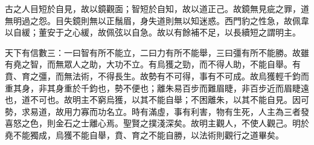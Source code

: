 
\begin{pinyinscope}
古之人目短於自見，故以鏡觀面；智短於自知，故以道正己。故鏡無見疵之罪，道無明過之怨。目失鏡則無以正鬚眉，身失道則無以知迷惑。西門豹之性急，故佩韋以自緩；董安于之心緩，故佩弦以自急。故以有餘補不足，以長續短之謂明主。

天下有信數三：一曰智有所不能立，二曰力有所不能舉，三曰彊有所不能勝。故雖有堯之智，而無眾人之助，大功不立。有烏獲之勁，而不得人助，不能自舉。有賁、育之彊，而無法術，不得長生。故勢有不可得，事有不可成。故烏獲輕千鈞而重其身，非其身重於千鈞也，勢不便也；離朱易百步而難眉睫，非百步近而眉睫遠也，道不可也。故明主不窮烏獲，以其不能自舉；不困離朱，以其不能自見。因可勢，求易道，故用力寡而功名立。時有滿虛，事有利害，物有生死，人主為三者發喜怒之色，則金石之士離心焉。聖賢之撲淺深矣。故明主觀人，不使人觀己。明於堯不能獨成，烏獲不能自舉，賁、育之不能自勝，以法術則觀行之道畢矣。


\end{pinyinscope}